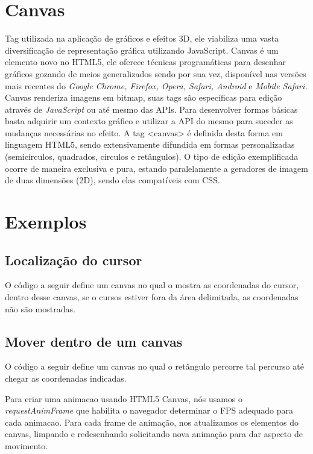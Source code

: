\documentclass[12pt,a4paper]{article}
\begin{document}
	
\section{Canvas}	

Tag utilizada na aplicação de gráficos e efeitos 3D, ele viabiliza uma vasta diversificação de representação gráfica utilizando JavaScript. Canvas é um elemento novo no HTML5, ele oferece técnicas programáticas para desenhar gráficos gozando de meios generalizados sendo por sua vez, disponível nas versões mais recentes do \textit{Google Chrome, Firefox, Opera, Safari, Android }e\textit{ Mobile Safari. }
	Canvas renderiza imagens em bitmap, suas tags são específicas para edição através de \textit{JavaScript} ou até mesmo das APIs. Para desenvolver formas básicas basta adquirir um contexto gráfico e utilizar a API do mesmo para suceder as mudanças necessárias no efeito. A tag <canvas> é definida desta forma em linguagem HTML5, sendo extensivamente difundida em formas personalizadas (semicírculos, quadrados, círculos e retângulos). O tipo de edição exemplificada ocorre de maneira exclusiva e pura, estando paralelamente a geradores de imagem de duas dimensões (2D), sendo elas compatíveis com CSS. 


\section{Exemplos}

\subsection{Localização do cursor}
O código a seguir define um canvas no qual o mostra as coordenadas do cursor, dentro desse canvas, se o cursos estiver fora da área delimitada, as coordenadas não são mostradas.


\subsection{Mover dentro de um canvas}

O código a seguir define um canvas no qual o retângulo percorre tal percurso até chegar as coordenadas indicadas.  



%

Para criar uma animacao usando HTML5 Canvas, nós usamos o \textit{requestAnimFrame} que habilita o navegador determinar o FPS adequado para cada animacao.  Para cada frame de animação, nos atualizamos os elementos do canvas, limpando e redesenhando solicitando nova animação para dar aspecto de movimento. 
\end{document}
